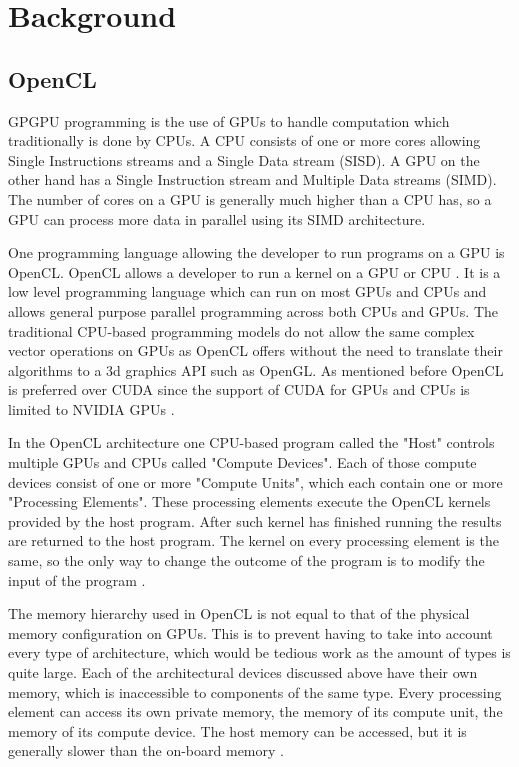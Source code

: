 \section{Background}
\subsection{OpenCL}
GPGPU programming is the use of GPUs to handle computation which traditionally is done by CPUs.
A CPU consists of one or more cores allowing Single Instructions streams and a Single Data stream (SISD).
A GPU on the other hand has a Single Instruction stream and Multiple Data streams (SIMD).
The number of cores on a GPU is generally much higher than a CPU has, so a GPU can process more data in parallel using its SIMD architecture.

One programming language allowing the developer to run programs on a GPU is OpenCL.
OpenCL allows a developer to run a kernel on a GPU or CPU \cite{OpenCL}.
It is a low level programming language which can run on most GPUs and CPUs and allows general purpose parallel programming across both CPUs and GPUs.
The traditional CPU-based programming models do not allow the same complex vector operations on GPUs as OpenCL offers without the need to translate their algorithms to a 3d graphics API such as OpenGL.
As mentioned before OpenCL is preferred over CUDA since the support of CUDA for GPUs and CPUs is limited to NVIDIA GPUs \cite{CUDA}.

In the OpenCL architecture one CPU-based program called the "Host" controls multiple GPUs and CPUs called "Compute Devices".
Each of those compute devices consist of one or more "Compute Units", which each contain one or more "Processing Elements".
These processing elements execute the OpenCL kernels provided by the host program.
After such kernel has finished running the results are returned to the host program.
The kernel on every processing element is the same, so the only way to change the outcome of the program is to modify the input of the program \cite{OpenCL}.

The memory hierarchy used in OpenCL is not equal to that of the physical memory configuration on GPUs.
This is to prevent having to take into account every type of architecture, which would be tedious work as the amount of types is quite large.
Each of the architectural devices discussed above have their own memory, which is inaccessible to components of the same type.
Every processing element can access its own private memory, the memory of its compute unit, the memory of its compute device.
The host memory can be accessed, but it is generally slower than the on-board memory \cite{OpenCL}.

